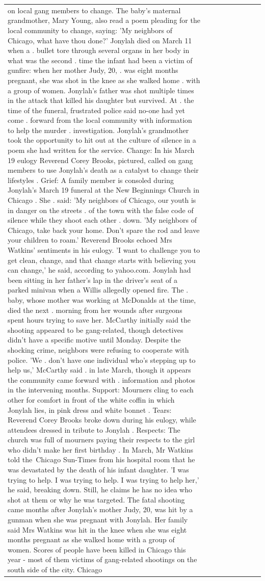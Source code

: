 \begin{table}[H]
\begin{tabular}{lllrlllll}
on local gang members to change. The baby's maternal grandmother, Mary Young, also read a poem pleading for the local community to change, saying: 'My neighbors of Chicago, what have thou done?' Jonylah died on March 11 when a . bullet tore through several organs in her body in what was the second . time the infant had been a victim of gunfire: when her mother Judy, 20, . was eight months pregnant, she was shot in the knee as she walked home . with a group of women. Jonylah's father was shot multiple times in the attack that killed his daughter but survived. At . the time of the funeral, frustrated police said no-one had yet come . forward from the local community with information to help the murder . investigation. Jonylah's grandmother took the opportunity to hit out at the culture of silence in a poem she had written for the service. Change: In his March 19 eulogy Reverend Corey Brooks, pictured, called on gang members to use Jonylah's death as a catalyst to change their lifestyles . Grief: A family member is consoled during Jonylah's March 19 funeral at the New Beginnings Church in Chicago . She . said: 'My neighbors of Chicago, our youth is in danger on the streets . of the town with the false code of silence while they shoot each other . down. 'My neighbors of Chicago, take back your home. Don't spare the rod and leave your children to roam.' Reverend Brooks echoed Mrs Watkins' sentiments in his eulogy. 'I want to challenge you to get clean, change, and that change starts with believing you can change,' he said, according to yahoo.com. Jonylah had been sitting in her father's lap in the driver's seat of a parked minivan when a Willis allegedly opened fire. The . baby, whose mother was working at McDonalds at the time, died the next . morning from her wounds after surgeons spent hours trying to save her. McCarthy initially said the shooting appeared to be gang-related, though detectives didn't have a specific motive until Monday. Despite the shocking crime, neighbors were refusing to cooperate with police. 'We . don't have one individual who's stepping up to help us,' McCarthy said . in late March, though it appears the community came forward with . information and photos in the intervening months. Support: Mourners cling to each other for comfort in front of the white coffin in which Jonylah lies, in pink dress and white bonnet . Tears: Reverend Corey Brooks broke down during his eulogy, while attendees dressed in tribute to Jonylah . Respects: The church was full of mourners paying their respects to the girl who didn't make her first birthday . In March, Mr Watkins told the Chicago Sun-Times from his hospital room that he was devastated by the death of his infant daughter. 'I was trying to help. I was trying to help. I was trying to help her,' he said, breaking down. Still, he claims he has no idea who shot at them or why he was targeted. The fatal shooting came months after Jonylah's mother Judy, 20, was hit by a gunman when she was pregnant with Jonylah. Her family said Mrs Watkins was hit in the knee when she was eight months pregnant as she walked home with a group of women. Scores of people have been killed in Chicago this year - most of them victims of gang-related shootings on the south side of the city. Chicago 
\end{tabular}
\end{table}
